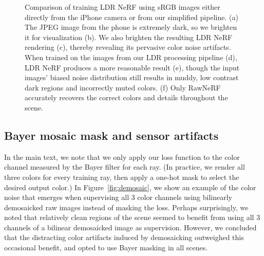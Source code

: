 \begin{figure}
    \centering
{}
    \caption{Comparison of training LDR NeRF using sRGB images either directly from the iPhone camera or from our simplified pipeline. (a) The JPEG image from the phone is extremely dark, so we brighten it for visualization (b). We also brighten the resulting LDR NeRF rendering (c), thereby revealing its pervasive color noise artifacts. When trained on the images from our LDR processing pipeline (d), LDR NeRF produces a more reasonable result (e), though the input images' biased noise distribution still results in muddy, low contrast dark regions and incorrectly muted colors. (f) Only RawNeRF accurately recovers the correct colors and details throughout the scene.}
    \label{fig:iphonejpeg}
\end{figure}

\subsection{Bayer mosaic mask and sensor artifacts}

In the main text, we note that we only apply our loss function to the color channel measured by the Bayer filter for each ray. (In practice, we render all three colors for every training ray, then apply a one-hot mask to select the desired output color.) In Figure~\ref{fig:demosaic}, we show an example of the color noise that emerges when supervising all 3 color channels using bilinearly demosaicked raw images instead of masking the loss. Perhaps surprisingly, we noted that relatively clean regions of the scene seemed to benefit from using all 3 channels of a bilinear demosaicked image as supervision. However, we concluded that the distracting color artifacts induced by demosaicking outweighed this occasional benefit, and opted to use Bayer masking in all scenes. 

